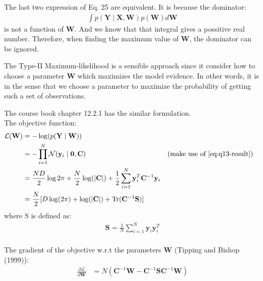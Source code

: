 \documentclass[12pt]{article}
\newenvironment{question}[2][Question]{\begin{trivlist}
\kern10pt
\item[\hskip \labelsep {\bfseries #1}\hskip \labelsep {\bfseries #2.}]}{\end{trivlist}}
\begin{document}
\begin{question}{14}
The last two expression of Eq. 25 are equivalent. It is because the dominator:
  \begin{align*} %
    \int p(\mathbf{Y}\mid\mathbf{X}, \mathbf{W})p(\mathbf{W})d\mathbf{W}
  \end{align*}
is not a function of $\mathbf{W}$. And we know that that integral gives a possitive
 real number. Therefore, when finding the maximum value of $\mathbf{W}$, the dominator 
 can be ignored.

The Type-II Maximum-likelihood is a sensible approach since it consider how to
 choose a parameter $\mathbf{W}$ which maximizes the model evidence. In other words,
 it is in the sense that we choose a parameter to maximize the probability of 
 getting such a set of observations.
\end{question}


\begin{question}{15}
The course book chapter 12.2.1 has the similar formulation.\\
The objective function:
\begin{align*}
  \mathcal{L}(\mathbf{W}) &= -\log(p(\mathbf{Y}\mid\mathbf{W})) \\
  &= -\prod_{i=1}^{N} \mathcal{N}(\mathbf{y}_i\mid\mathbf{0}, \mathbf{C})
      && \text{(make use of \eqref{eq:q13-result})} \\
  &= \frac{ND}{2}\log{2\pi} + \frac{N}{2}\log(|\mathbf{C}|) 
     + \frac{1}{2} \sum_{i=1}^{N} \mathbf{y}_i^T \mathbf{C}^{-1}\mathbf{y}_i \\
  &= \frac{N}{2}[D\log(2\pi) + \log(|\mathbf{C}|) + \text{Tr}(\mathbf{C}^{-1}\mathbf{S})]
\end{align*}
where S is defined as:
\begin{align*}
  \mathbf{S} = \frac{1}{N}\sum_{i=1}^{N} \mathbf{y}_i\mathbf{y}_i^T
\end{align*}
\\
The gradient of the objective w.r.t the parameters $\mathbf{W}$
(Tipping and Bishop (1999)):
\begin{align*}
  \frac{\partial{\mathcal{L}}}{\partial{\mathbf{W}}} 
    &= N(\mathbf{C}^{-1}\mathbf{W} 
         - \mathbf{C}^{-1}\mathbf{S}\mathbf{C}^{-1}\mathbf{W})
\end{align*}
\end{question}
\end{document}
